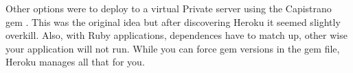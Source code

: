 Other options were to deploy to a virtual Private server using the Capistrano gem \citep{capistrano:2013}. This was the original idea but after discovering Heroku it seemed slightly overkill. Also, with Ruby applications, dependences have to match up, other wise your application will not run. While you can force gem versions in the gem file, Heroku manages all that for you.
